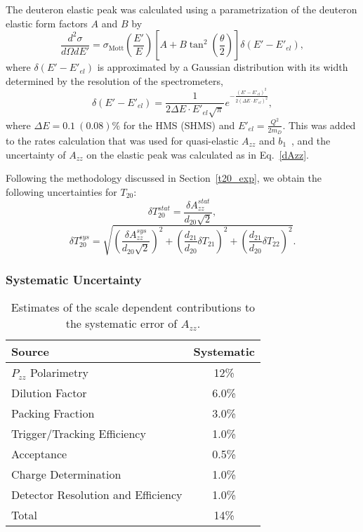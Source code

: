 The deuteron elastic peak was calculated using a parametrization of the deuteron elastic form factors $A$ and $B$ by
\begin{equation}
\frac{d^2 \sigma}{d\Omega dE'} = \sigma_{\mathrm{Mott}}\left(\frac{E'}{E}\right)\left[ A + B \tan ^2 \left( \frac{\theta}{2} \right) \right] \delta (E'-E'_{el}),
\end{equation}
where $\delta(E'-E'_{el})$ is approximated by a Gaussian distribution with its width determined by the resolution of the spectrometers, 
\begin{equation}
\delta(E'-E'_{el}) = \frac{1}{2\Delta E\cdot E'_{el}\sqrt{\pi}}e^{-\frac{(E'-E'_{el})^2}{2(\Delta E\cdot E'_{el})^2}}, 
\end{equation}
where $\Delta E=0.1 ~(0.08)\%$ for the HMS (SHMS) and $E'_{el}=\frac{Q^2}{2m_D}.$ This was added to the rates calculation that was used for quasi-elastic $A_{zz}$ and $b_1$~\cite{Long:2013tn}, and the uncertainty of $A_{zz}$ on the elastic peak was calculated as in Eq.~\ref{dAzz}.



Following the methodology discussed in Section~\ref{t20_exp}, we obtain the following uncertainties for $T_{20}$:
\begin{equation} \delta  T_{20}^{stat} =  \frac{\delta  A_{zz}^{stat}}{d_{20}\sqrt{2}},
\end{equation}
\begin{equation} \delta  T_{20}^{sys} =\sqrt{ \left(\frac{\delta A_{zz}^{sys}}{d_{20}\sqrt{2}}\right)^2 + \left(\frac{d_{21}}{d_{20}}\delta T_{21}\right)^2 +  \left(\frac{d_{21}}{d_{20}}\delta T_{22}\right)^2}.
\end{equation}





\iffalse
\subsubsection{Systematic Uncertainty}%
\begin{table}
\begin{center}
\begin{tabular}{l|c}\hline\hline
Source								& Systematic \\
\hline
$P_{zz}$ Polarimetry					& 12\%   \\
Dilution Factor						& 6.0\%   \\
Packing Fraction						& 3.0\%   \\
Trigger/Tracking Efficiency			& 1.0\% \\
Acceptance							& 0.5\% \\
Charge Determination					& 1.0\%  \\
Detector Resolution and Efficiency	& 1.0\% \\
\hline
Total								& 14\%   \\
\hline
\end{tabular}
\caption{\label{error1}Estimates of the scale dependent contributions to the systematic error of $A_{zz}$.}
\end{center}
\end{table}

